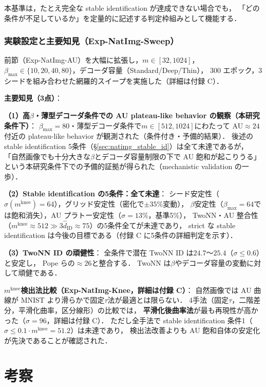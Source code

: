 \documentclass[11pt,a4paper]{jsarticle}
\newcommand{\mknee}{m^{\mathrm{knee}}}
\begin{document}
本基準は，たとえ完全な stable identification が達成できない場合でも，
「どの条件が不足しているか」を定量的に記述する判定枠組みとして機能する．

\subsubsection*{実験設定と主要知見（Exp-NatImg-Sweep）}

前節（Exp-NatImg-AU）を大幅に拡張し，$m \in [32, 1024]$，
$\beta_{\max} \in \{10,20,40,80\}$，デコーダ容量（Standard/Deep/Thin），
300 エポック，3シードを組み合わせた網羅的スイープを実施した（詳細は付録 C）．

\textbf{主要知見（3点）}：

\textbf{（1）高$\beta$・薄型デコーダ条件での AU plateau-like behavior の観察（本研究条件下）}：
$\beta_{\max}=80$・薄型デコーダ条件で$m \in [512, 1024]$にわたって AU$\approx 24$付近の
plateau-like behavior が観測された（条件付き・予備的結果）．
後述の stable identification 5条件（§\ref{sec:natimg_stable_id}）は全て未達であるが，
「自然画像でも十分大きな$\beta$とデコーダ容量制限の下で AU 飽和が起こりうる」
という本研究条件下での予備的証拠が得られた（mechanistic validation の一歩）．

\textbf{（2）Stable identification の5条件：全て未達}：
シード安定性（$\sigma(\mknee)=64$），グリッド安定性（密化で$\pm35\%$変動），
$\beta$安定性（$\beta_{\max}=64$では飽和消失），AU プラトー安定性（$\sigma=13\%$，基準5\%），
TwoNN・AU 整合性（$\mknee \approx 512 \gg 3\hat{d}_\mathrm{ID} \approx 75$）の5条件全てが未達であり，
strict な stable identification は今後の目標である（付録 C に5条件の詳細判定を示す）．

\textbf{（3）TwoNN ID の頑健性}：
全条件で潜在 TwoNN ID は$24.7$〜$25.4$（$\sigma \leq 0.6$）と安定し，
Pope ら\cite{pope2021intrinsic}の$\approx 26$と整合する．
TwoNN は$\beta$やデコーダ容量の変動に対して頑健である．

\textbf{$\mknee$検出法比較（Exp-NatImg-Knee，詳細は付録 C）}：
自然画像では AU 曲線が MNIST より滑らかで固定$\tau$法が最適とは限らない．
4手法（固定$\tau$，二階差分，平滑化曲率，区分線形）の比較では，
\textbf{平滑化後曲率法}が最も再現性が高かった（$\sigma=96$，詳細は付録 C）．
ただし全手法で stable identification 条件1（$\sigma \leq 0.1\cdot\mknee = 51.2$）は未達であり，
検出法改善よりも AU 飽和自体の安定化が先決であることが確認された．

\section{考察}\label{sec:discussion}
\end{document}
